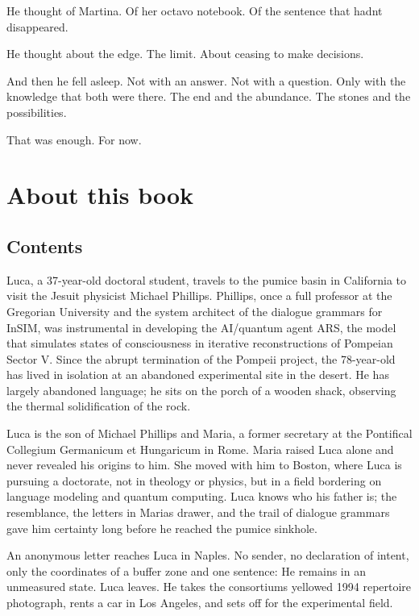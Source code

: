 \documentclass[
  ngerman,
]{article}
\begin{document}
He thought of Martina. Of her octavo notebook. Of the sentence that
hadn\textquotesingle t disappeared.

He thought about the edge. The limit. About ceasing to make decisions.

And then he fell asleep. Not with an answer. Not with a question. Only
with the knowledge that both were there. The end and the abundance. The
stones and the possibilities.

That was enough. For now.

\section{About this book}\label{about-this-book}

\subsection{Contents}\label{contents}

Luca, a 37-year-old doctoral student, travels to the pumice basin in
California to visit the Jesuit physicist Michael Phillips. Phillips,
once a full professor at the Gregorian University and the system
architect of the dialogue grammars for InSIM, was instrumental in
developing the AI/quantum agent ARS, the model that simulates states of
consciousness in iterative reconstructions of Pompeian Sector V. Since
the abrupt termination of the Pompeii project, the 78-year-old has lived
in isolation at an abandoned experimental site in the desert. He has
largely abandoned language; he sits on the porch of a wooden shack,
observing the thermal solidification of the rock.

Luca is the son of Michael Phillips and Maria, a former secretary at the
Pontifical Collegium Germanicum et Hungaricum in Rome. Maria raised Luca
alone and never revealed his origins to him. She moved with him to
Boston, where Luca is pursuing a doctorate, not in theology or physics,
but in a field bordering on language modeling and quantum computing.
Luca knows who his father is; the resemblance, the letters in
Maria\textquotesingle s drawer, and the trail of dialogue grammars gave
him certainty long before he reached the pumice sinkhole.

An anonymous letter reaches Luca in Naples. No sender, no declaration of
intent, only the coordinates of a buffer zone and one sentence: He
remains in an unmeasured state. Luca leaves. He takes the
consortium\textquotesingle s yellowed 1994 repertoire photograph, rents
a car in Los Angeles, and sets off for the experimental field.
\end{document}
